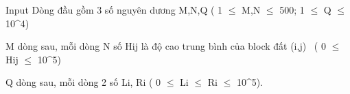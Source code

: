Input
Dòng đầu gồm 3 số nguyên dương M,N,Q ( 1  $\le$  M,N  $\le$  500; 1  $\le$  Q  $\le$  10^4)

M dòng sau, mỗi dòng N số Hij là độ cao trung bình của block đất (i,j)  ( 0  $\le$  Hij $\le$  10^5)

Q dòng sau, mỗi dòng 2 số Li, Ri ( 0  $\le$  Li $\le$  Ri $\le$  10^5).